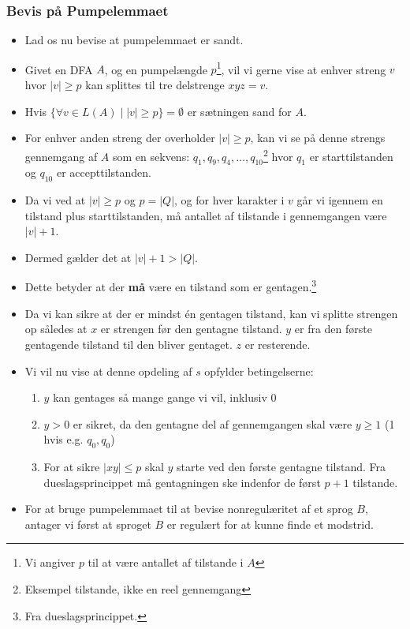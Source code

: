 \begin{frame}[allowframebreaks]
	\frametitle{Bevis på Pumpelemmaet}
	\begin{itemize}
		\item Lad os nu bevise at pumpelemmaet er sandt.
		\item Givet en DFA $A$, og en pumpelængde $p$\footnote{Vi angiver $p$ til at være antallet af tilstande i $A$}, vil vi gerne vise at enhver streng $v$ hvor $|v| \ge p$ kan splittes til tre delstrenge $xyz = v$.
		\item Hvis $\{\forall v \in L(A)  \mid |v| \ge p\} = \emptyset$ er sætningen sand for $A$.
		\item For enhver anden streng der overholder $|v| \ge p$, kan vi se på denne strengs gennemgang af $A$ som en sekvens: $q_{1}, q_{9}, q_{4}, \ldots, q_{10}$\footnote{Eksempel tilstande, ikke en reel gennemgang} hvor $q_{1}$ er starttilstanden og $q_{10}$ er accepttilstanden.
		\item Da vi ved at $|v| \ge p$ og $p = |Q|$, og for hver karakter i $v$ går vi igennem en tilstand plus starttilstanden, må antallet af tilstande i gennemgangen være $|v| + 1$.
		\item Dermed gælder det at $|v| + 1 > |Q|$.
		\item Dette betyder at der \textbf{må} være en tilstand som er gentagen.\footnote{Fra dueslagsprincippet.}
		\item Da vi kan sikre at der er mindst én gentagen tilstand, kan vi splitte strengen op således at $x$ er strengen før den gentagne tilstand. $y$ er fra den første gentagende tilstand til den bliver gentaget. $z$ er resterende.
		\item Vi vil nu vise at denne opdeling af $s$ opfylder betingelserne:
		      \begin{enumerate}
			      \item $y$ kan gentages så mange gange vi vil, inklusiv $0$
			      \item $y > 0$ er sikret, da den gentagne del af gennemgangen skal være $y \ge 1$ (1 hvis e.g. $q_{0}, q_{0}$)
			      \item For at sikre $|xy| \le p$ skal $y$ starte ved den første gentagne tilstand. Fra dueslagsprincippet må gentagningen ske indenfor de først $p+1$ tilstande.
		      \end{enumerate}
		\item For at bruge pumpelemmaet til at bevise nonregulæritet af et sprog $B$, antager vi først at sproget $B$ er regulært for at kunne finde et modstrid.
	\end{itemize}
\end{frame}


